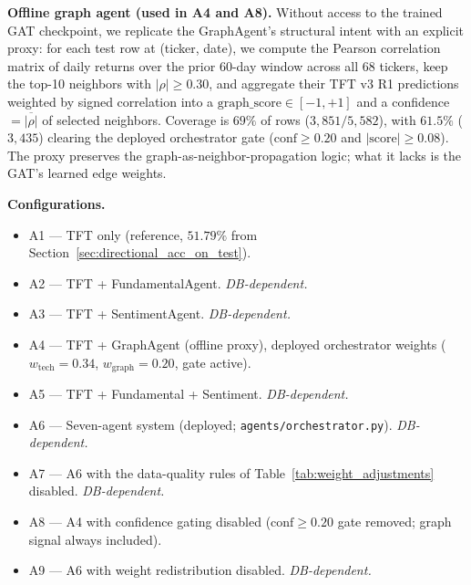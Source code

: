 \documentclass[conference]{IEEEtran}
\begin{document}
\textbf{Offline graph agent (used in A4 and A8).} Without access to the trained GAT checkpoint, we replicate the GraphAgent's structural intent with an explicit proxy: for each test row at (ticker, date), we compute the Pearson correlation matrix of daily returns over the prior 60-day window across all 68 tickers, keep the top-10 neighbors with $|\rho| \geq 0.30$, and aggregate their TFT v3 R1 predictions weighted by signed correlation into a $\text{graph\_score} \in [-1,+1]$ and a confidence $= \overline{|\rho|}$ of selected neighbors. Coverage is $69\%$ of rows ($3{,}851/5{,}582$), with $61.5\%$ ($3{,}435$) clearing the deployed orchestrator gate ($\text{conf}\!\ge\!0.20$ and $|\text{score}|\!\ge\!0.08$). The proxy preserves the graph-as-neighbor-propagation logic; what it lacks is the GAT's learned edge weights.

\textbf{Configurations.}
\begin{itemize}
\item A1 --- TFT only (reference, $51.79\%$ from Section~\ref{sec:directional_acc_on_test}).
\item A2 --- TFT + FundamentalAgent. \emph{DB-dependent.}
\item A3 --- TFT + SentimentAgent. \emph{DB-dependent.}
\item A4 --- TFT + GraphAgent (offline proxy), deployed orchestrator weights ($w_\text{tech}\!=\!0.34$, $w_\text{graph}\!=\!0.20$, gate active).
\item A5 --- TFT + Fundamental + Sentiment. \emph{DB-dependent.}
\item A6 --- Seven-agent system (deployed; \texttt{agents/orchestrator.py}). \emph{DB-dependent.}
\item A7 --- A6 with the data-quality rules of Table~\ref{tab:weight_adjustments} disabled. \emph{DB-dependent.}
\item A8 --- A4 with confidence gating disabled ($\text{conf}\!\ge\!0.20$ gate removed; graph signal always included).
\item A9 --- A6 with weight redistribution disabled. \emph{DB-dependent.}
\end{itemize}
\end{document}
